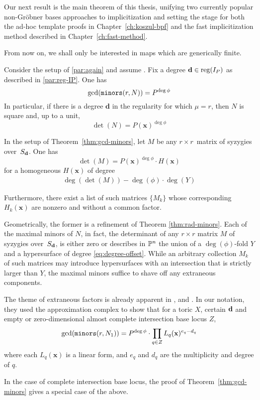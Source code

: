 \documentclass[fleqn,reqno]{amsart}
\numberwithin{first}{chapter}
\begin{document}
\begin{paragraf*}
Our next result is the main theorem of this thesis, unifying two currently
popular non-Gr\"{o}bner bases approaches to implicitization and setting the stage for both
the ad-hoc template proofs in Chapter~\ref{ch:koszul-bpf} and
the fast implicitization method described in Chapter~\ref{ch:fast-method}.

From now on, we shall only be interested in maps which are generically finite.
\end{paragraf*}

\begin{theorem}
\label{thm:gcd-minors}
Consider the setup of \eqref{par:again} and assume .
Fix a degree $\mathbf d\in\operatorname{reg}(I_P)$ as described in \eqref{par:reg-IP}.
One has
\[
\gcd(\mathop{\tt minors}(r, N))=P^{\deg\phi}
\]
In particular, if there is a degree $\mathbf d$ in the regularity for which $\mu=r$,
then $N$ is square and, up to a unit,
\[
\det(N)=P(\mathbf x)^{\deg\phi}
\]
\end{theorem}

\begin{corollary}
\label{thm:detM}
In the setup of Theorem~\ref{thm:gcd-minors},
let $M$ be any $r\times r$~matrix of syzygies over~$S_\mathbf d$. One has
\[
	\det(M)=P(\mathbf x)^{\deg\phi}\cdot H(\mathbf x)
\]
for a homogeneous $H(\mathbf x)$ of degree
\begin{align}
\label{eq:degree-offset}
\deg(\det(M))-\deg(\phi)\cdot\deg(Y)
\end{align}

Furthermore, there exist a list of such matrices $\{M_k\}$ whose
corresponding $H_k(\mathbf x)$ are nonzero and without a common factor.
\end{corollary}

\begin{paragraf*}
Geometrically, the former is a refinement of Theorem \ref{thm:rad-minors}.
Each of the maximal minors of $N$, in fact,
the determinant of any $r\times r$ matrix $M$ of syzygies over~$S_\mathbf d$, is either zero
or describes in $\mathbb{P}^n$ the union of a $\deg(\phi)$-fold $Y$ and
a hypersurface of degree \eqref{eq:degree-offset}.
While an arbitrary collection $M_k$ of such matrices may introduce hypersurfaces
with an intersection that is strictly larger than $Y$,
the maximal minors suffice to shave off any extraneous components.

The theme of extraneous factors is already apparent in
\citet{BCD-03}, \citet{BCJ-09} and \citet{BDD-09}.
In our notation, they used the approximation complex to show that for a toric $X$,
certain $\mathbf d$ and empty or zero-dimensional almost complete intersection base locus $Z$,
\[
	\gcd(\mathop{\tt minors}(r,N_1))=P^{\deg\phi}\cdot\prod_{q\in Z} L_q(\mathbf x)^{e_q-d_q}
\]
where each $L_q(\mathbf x)$ is a linear form, and
$e_q$ and $d_q$ are the multiplicity and degree of $q$.

In the case of complete intersection base locus, the proof of Theorem~\ref{thm:gcd-minors}
gives a special case of the above.
\end{paragraf*}
\end{document}
